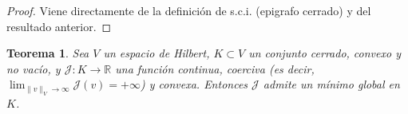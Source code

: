 \documentclass[12pt]{book}
\newtheorem{theorem}{Teorema}
\theoremstyle{definition}
\theoremstyle{plain}
\theoremstyle{remark}
\begin{document}
\begin{proof}
Viene directamente de la definición de s.c.i. (epigrafo cerrado) y del resultado anterior. 
\end{proof}

%
%


\begin{theorem}
    Sea \(V\) un espacio de Hilbert, \(K \subset V\) un conjunto cerrado, convexo y no vacío, y \(\mathcal{J}: K \to \mathbb{R}\) una función continua, coerciva (es decir, \(\lim_{\|v\|_V \to \infty} \mathcal{J}(v) = +\infty\)) y convexa. Entonces \(\mathcal{J}\) admite un mínimo global en \(K\).
\end{theorem}
\end{document}
